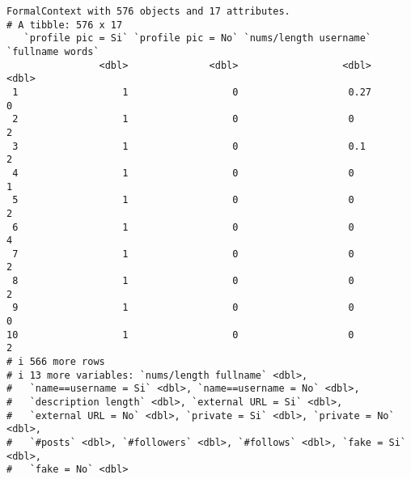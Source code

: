 \documentclass[
  letterpaper,
  DIV=11,
  numbers=noendperiod]{scrreprt}
\newenvironment{Shaded}{\begin{snugshade}}{\end{snugshade}}
\newcommand{\AttributeTok}[1]{\textcolor[rgb]{0.40,0.45,0.13}{#1}}
\newcommand{\FunctionTok}[1]{\textcolor[rgb]{0.28,0.35,0.67}{#1}}
\newcommand{\NormalTok}[1]{\textcolor[rgb]{0.00,0.23,0.31}{#1}}
\newcommand{\SpecialCharTok}[1]{\textcolor[rgb]{0.37,0.37,0.37}{#1}}
\newcommand{\StringTok}[1]{\textcolor[rgb]{0.13,0.47,0.30}{#1}}
\begin{document}
\begin{Shaded}
\end{Shaded}

\begin{verbatim}
FormalContext with 576 objects and 17 attributes.
# A tibble: 576 x 17
   `profile pic = Si` `profile pic = No` `nums/length username` `fullname words`
                <dbl>              <dbl>                  <dbl>            <dbl>
 1                  1                  0                   0.27                0
 2                  1                  0                   0                   2
 3                  1                  0                   0.1                 2
 4                  1                  0                   0                   1
 5                  1                  0                   0                   2
 6                  1                  0                   0                   4
 7                  1                  0                   0                   2
 8                  1                  0                   0                   2
 9                  1                  0                   0                   0
10                  1                  0                   0                   2
# i 566 more rows
# i 13 more variables: `nums/length fullname` <dbl>,
#   `name==username = Si` <dbl>, `name==username = No` <dbl>,
#   `description length` <dbl>, `external URL = Si` <dbl>,
#   `external URL = No` <dbl>, `private = Si` <dbl>, `private = No` <dbl>,
#   `#posts` <dbl>, `#followers` <dbl>, `#follows` <dbl>, `fake = Si` <dbl>,
#   `fake = No` <dbl>
\end{verbatim}
\end{document}
